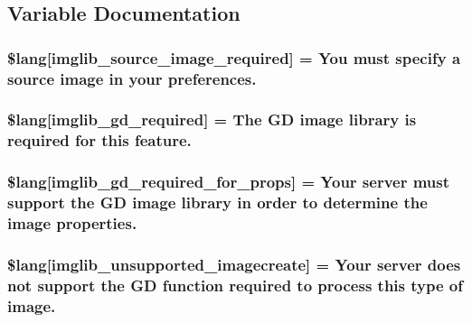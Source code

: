 

\subsection{Variable Documentation}
\hypertarget{imglib__lang_8php_af48787ab142f633036ebdf1cc5da7409}{}
\subsubsection[{\$lang}]{\setlength{\rightskip}{0pt plus 5cm}\$lang\mbox{[}\textquotesingle{}imglib\+\_\+source\+\_\+image\+\_\+required\textquotesingle{}\mbox{]} = \textquotesingle{}You must specify {\bf a} source image in your preferences.\textquotesingle{}}\label{imglib__lang_8php_af48787ab142f633036ebdf1cc5da7409}
\hypertarget{imglib__lang_8php_aa8d7f8276e62fbe759daef2021c16552}{}
\subsubsection[{\$lang}]{\setlength{\rightskip}{0pt plus 5cm}\$lang\mbox{[}\textquotesingle{}imglib\+\_\+gd\+\_\+required\textquotesingle{}\mbox{]} = \textquotesingle{}The G\+D image library is required {\bf for} this feature.\textquotesingle{}}\label{imglib__lang_8php_aa8d7f8276e62fbe759daef2021c16552}
\hypertarget{imglib__lang_8php_a0da9c99f9e2b5f38ccbefb9d9f702c5e}{}
\subsubsection[{\$lang}]{\setlength{\rightskip}{0pt plus 5cm}\$lang\mbox{[}\textquotesingle{}imglib\+\_\+gd\+\_\+required\+\_\+for\+\_\+props\textquotesingle{}\mbox{]} = \textquotesingle{}Your server must support the G\+D image library in order to determine the image properties.\textquotesingle{}}\label{imglib__lang_8php_a0da9c99f9e2b5f38ccbefb9d9f702c5e}
\hypertarget{imglib__lang_8php_ace032cbe8dafb1f3417a758d0914ecdb}{}
\subsubsection[{\$lang}]{\setlength{\rightskip}{0pt plus 5cm}\$lang\mbox{[}\textquotesingle{}imglib\+\_\+unsupported\+\_\+imagecreate\textquotesingle{}\mbox{]} = \textquotesingle{}Your server does not support the G\+D function required to process this type of image.\textquotesingle{}}\label{imglib__lang_8php_ace032cbe8dafb1f3417a758d0914ecdb}
\hypertarget{imglib__lang_8php_a235a59a6660145fc136b3933b5b10675}{}
